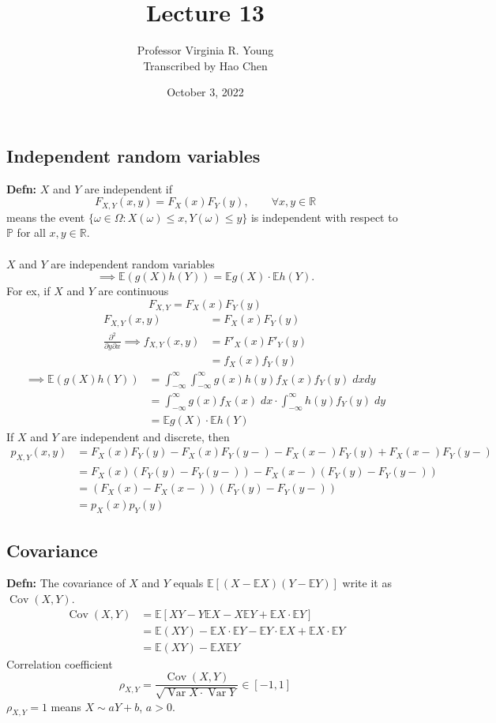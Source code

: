 \documentclass[a4paper]{article}
\title{Lecture 13}
\author{Professor Virginia R. Young\\ \small{Transcribed by Hao Chen}}
\date{October 3, 2022}
\newcommand{\n}{\hfill\break}
\newcommand{\defn}[1]{\par\noindent\settowidth{\hangindent}{\textbf{Defn: }}\textbf{Defn: }#1\n}
\newcommand{\reals}{\mathbb{R}}
\newcommand{\R}{\reals}
\newcommand{\Prob}{\mathbb{P}}
\renewcommand{\P}{\Prob}
\newcommand{\Avg}{\mathbb{E}}
\newcommand{\E}{\Avg}
\DeclareMathOperator{\Var}{Var}
\DeclareMathOperator{\Cov}{Cov}
\begin{document}
\maketitle

\subsection*{Independent random variables}
\defn{
    $X$ and $Y$ are independent if
    \[F_{X,Y}(x,y)=F_X(x)F_Y(y), \qquad\forall x,y\in\R\]
    means the event $\{\omega\in\Omega:X(\omega)\leq x, Y(\omega)\leq y\}$ is independent with respect to $\P$ for all $x, y\in\R$.
    \\\\
    $X$ and $Y$ are independent random variables
    \[\implies\E(g(X)h(Y))=\E g(X)\cdot\E h(Y).\]
    For ex, if $X$ and $Y$ are continuous
    \[F_{X,Y}=F_X(x)F_Y(y)\]
    \begin{align*}
        F_{X,Y}(x,y)&=F_X(x)F_Y(y) \\
        \frac{\partial^2}{\partial y \partial x}\implies f_{X,Y}(x,y)&=F'_X(x)F'_Y(y) \\
        &=f_X(x)f_Y(y)
    \end{align*}
    \begin{align*}
        \implies\E(g(X)h(Y))&=\int^\infty_{-\infty}\int^\infty_{-\infty}g(x)h(y)f_X(x)f_Y(y)\;dxdy \\
        &=\int^\infty_{-\infty}g(x)f_X(x)\;dx\cdot\int^\infty_{-\infty}h(y)f_Y(y)\;dy \\
        &=\E g(X)\cdot\E h(Y)
    \end{align*}
    If $X$ and $Y$ are independent and discrete, then
    \begin{align*}
        p_{X,Y}(x,y)&=F_X(x)F_Y(y)-F_X(x)F_Y(y-)-F_X(x-)F_Y(y)+F_X(x-)F_Y(y-) \\
        &=F_X(x)(F_Y(y)-F_Y(y-))-F_X(x-)(F_Y(y)-F_Y(y-)) \\
        &=(F_X(x)-F_X(x-))(F_Y(y)-F_Y(y-)) \\
        &=p_X(x)p_Y(y)
    \end{align*}
}

\subsection*{Covariance}

\defn{
    The covariance of $X$ and $Y$ equals $\E[(X-\E X)(Y-\E Y)]$ write it as $\Cov(X,Y)$.
    \begin{align*}
        \Cov(X,Y)&=\E[XY-Y\E X-X\E Y+\E X\cdot \E Y] \\
        &=\E(XY) - \E X\cdot\E Y - \E Y\cdot\E X + \E X\cdot\E Y \\
        &=\E(XY) - \E X\E Y
    \end{align*}
    Correlation coefficient
    \[\rho_{X,Y}=\frac{\Cov(X,Y)}{\sqrt{\Var X\cdot\Var Y}}\in[-1, 1]\]
    $\rho_{X,Y}=1$ means $X\sim aY+b$, $a>0$.
}
\end{document}
